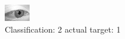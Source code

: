 \begin{figure}[h!]
\begin{center}
\includegraphics[width=0.60\columnwidth]{figures/ID2734_class_2_target_1.png}
\end{center}
\caption{ Classification: 2 actual target: 1}
\label{fig:ID2734_class_2_target_1}
\end{figure}
